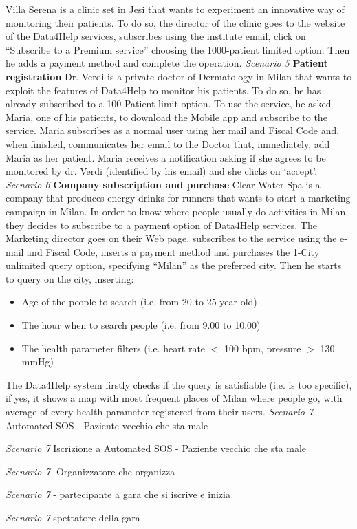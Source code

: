 Villa Serena is a clinic set in Jesi that wants to experiment an innovative way of monitoring their patients. To do so, the director of the clinic goes to the website of the Data4Help services, subscribes using the institute email, click on “Subscribe to a Premium service” choosing the 1000-patient limited option. Then he adds a payment method and complete the operation.
\vspace{2mm} \newline
\noindent \emph{Scenario 5} \textbf{Patient registration} \newline
Dr. Verdi is a private doctor of Dermatology in Milan that wants to exploit the features of Data4Help to monitor his patients. To do so, he has already subscribed to a 100-Patient limit option. To use the service, he asked Maria, one of his patients, to download the Mobile app and subscribe to the service.
Maria subscribes as a normal user using her mail and Fiscal Code and, when finished, communicates her email to the Doctor that, immediately, add Maria as her patient. Maria receives a notification asking if she agrees to be monitored by dr. Verdi (identified by his email) and she clicks on ‘accept’.
\vspace{2mm}\newline
\noindent \emph{Scenario 6} \textbf{Company subscription and purchase} \newline
Clear-Water Spa is a company that produces energy drinks for runners that wants to start a marketing campaign in Milan. In order to know where people usually do activities in Milan, they decides to subscribe to a payment option of Data4Help services. The Marketing director goes on their Web page, subscribes to the service using the e-mail and Fiscal Code, inserts a payment method and purchases the 1-City unlimited query option, specifying “Milan” as the preferred city.
Then he starts to query on the city, inserting:
\begin{itemize}
    \item Age of the people to search (i.e. from 20 to 25 year old)
    \item The hour when to search people (i.e. from 9.00 to 10.00)
    \item The health parameter filters (i.e. heart rate $<$ 100 bpm, pressure $>$ 130 mmHg)
\end{itemize}
 The Data4Help system firstly checks if the query is satisfiable (i.e. is too specific), if yes, it shows a map with most frequent places of Milan where people go, with average of every health parameter registered from their users.
\vspace{2mm} \newline
\noindent \emph{Scenario 7} Automated SOS - Paziente vecchio che sta male

\noindent \emph{Scenario 7} Iscrizione a Automated SOS - Paziente vecchio che sta male

\noindent \emph{Scenario 7}- Organizzatore che organizza

\noindent \emph{Scenario 7} - partecipante a gara  che si iscrive e inizia

\noindent \emph{Scenario 7} spettatore della gara
